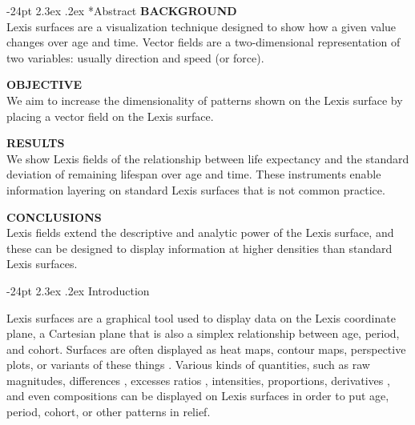 \documentclass[10pt, twoside, parskip=half]{article}
\title{\large\textbf{Lexis Fields}\vskip 0em}
\author{\normalsize\textrm{\textbf{(authors redacted)}}}
\date{\vspace{-5ex}}
\makeatletter
\renewcommand\section{\@startsection {section}{1}{\z@}%
                                   {-24pt}%
                                   {2.3ex \@plus.2ex}%
                                   {\normalfont\large\bfseries}}
\makeatother
\begin{document}
  \maketitle

\vspace*{-24pt}
\vspace*{5mm}
\setlength{\parskip}{0.5em}
\section*{Abstract}
  \noindent\textbf{BACKGROUND}\\
  Lexis surfaces are a visualization technique designed to show how a given value changes over age and time. Vector fields are a two-dimensional representation of two variables: usually direction and speed (or force).
  \par
  \noindent\textbf{OBJECTIVE}\\
  We aim to increase the dimensionality of patterns shown on the Lexis surface by placing a vector field on the Lexis surface.
  \par
  \noindent\textbf{RESULTS}\\
  We show Lexis fields of the relationship between life expectancy and the standard deviation of remaining lifespan over age and time. These instruments enable information layering on standard Lexis surfaces that is not common practice.
  \par
  \noindent\textbf{CONCLUSIONS}\\
  Lexis fields extend the descriptive and analytic power of the Lexis surface, and these can be designed to display information at higher densities than standard Lexis surfaces.
  \par
\vspace*{12pt}

\setlength{\parskip}{0ex}

\newpage

\hypertarget{introduction}{%
\section{Introduction}\label{introduction}}

Lexis surfaces are a graphical tool used to display data on the Lexis coordinate plane, a Cartesian plane that is also a simplex relationship between age, period, and cohort. Surfaces are often displayed as heat maps, contour maps, perspective plots, or variants of these things \citep{vaupel1987thousands}. Various kinds of quantities, such as raw magnitudes, differences \citep{minton2017visualising}, excesses \citep[\citet{acosta2019apc}]{remund2018cause} ratios \citep{canudas2005age}, intensities, proportions, derivatives \citep{rau2017visualizing}, and even compositions \citep{scholey2017visualizing} can be displayed on Lexis surfaces in order to put age, period, cohort, or other patterns in relief.
\end{document}
